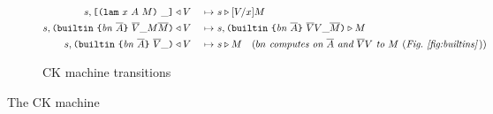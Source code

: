 \documentclass[../plutus-core-specification.tex]{subfiles}
\begin{document}
\begin{figure}[H]
\begin{subfigure}[c]{\linewidth}
\begin{minipage}{\linewidth}
\begin{alignat*}{2}
  s,\texttt{[} \texttt{(} \texttt{lam} ~ x ~ A ~ M \texttt{)} ~ \_ \texttt{]} &\triangleleft V
                                            &~\mapsto~&  s \triangleright [V/x]M\\
  s,\texttt{(} \texttt{builtin} ~ \texttt{\{} \mathit{bn} ~ \overline{A} \texttt{\}} ~ \overline{V} \_ M \overline{M} \texttt{)} & \triangleleft V
                                            &~\mapsto~& s,\texttt{(} \texttt{builtin} ~ \texttt{\{} \mathit{bn} ~ \overline{A} \texttt{\}} ~ \overline{V} V \_ \overline{M} \texttt{)} \triangleright M\\
  s,\texttt{(} \texttt{builtin} ~ \texttt{\{} \mathit{bn} ~ \overline{A} \texttt{\}} ~ \overline{V} \_  \texttt{)} &\triangleleft V
                                            &~\mapsto~& s \triangleright M
                                              \quad (\textit{$bn$ computes on $\overline{A}$ and $\overline{V}V$
                                              to $M$ \textup{(}Fig.~\ref{fig:builtins}\,\textup{)}})\\
    \end{alignat*}
\end{minipage}
    \caption{CK machine transitions}
    \label{fig:typed-ck-transitions}
\end{subfigure}
\caption{The CK machine}
\label{fig:typed-ck-machine}
\end{figure}
\end{document}
